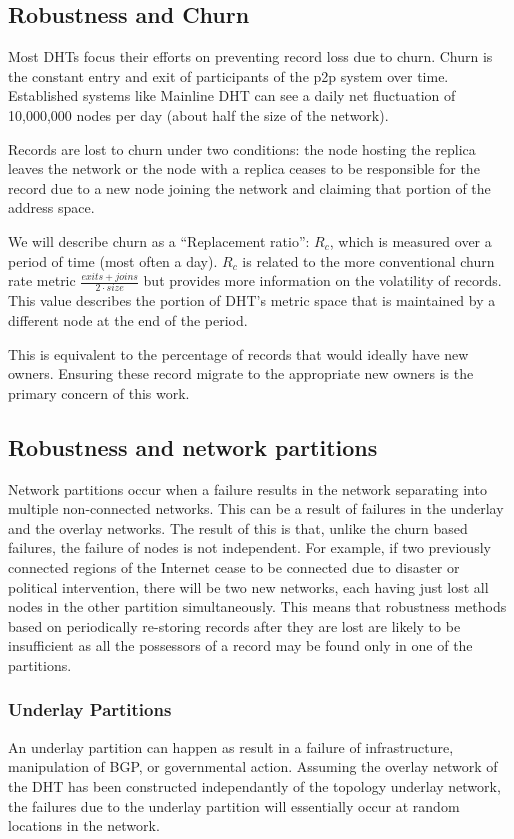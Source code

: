 	\subsection{Robustness and Churn}
	Most DHTs focus their efforts on preventing record loss due to churn.
	Churn is the constant entry and exit of participants of the p2p system over time.
	Established systems like Mainline DHT can see a daily net fluctuation of 10,000,000 nodes per day \cite{6688697} (about half the size of the network). 
	
	Records are lost to churn under two conditions: the node hosting the replica leaves the network or the node with a replica ceases to be responsible for the record due to a new node joining the network and claiming that portion of the address space. 
	
	We will describe churn as a ``Replacement ratio'': $R_{c}$, which is measured over a period of time (most often a day).
	$R_{c}$ is related to the more conventional churn rate metric $\frac{exits + joins}{2 \cdot size}$ but provides more information on the volatility of records.
	This value describes the portion of DHT's metric space that is maintained by a different node at the end of the period.
	
	This is equivalent to the percentage of records that would ideally have new owners.
	Ensuring these record migrate to the appropriate new owners is the primary concern of this work.  %
	
	
	\subsection{Robustness and network partitions}
	Network partitions occur when a failure results in the network separating into multiple non-connected networks.
	This can be a result of failures in the underlay and the overlay networks.
	The result of this is that, unlike the churn based failures,  the failure of nodes is not independent.
	For example, if two previously connected regions of the Internet cease to be connected due to disaster or political intervention, there will be two new networks, each having just lost all nodes in the other partition simultaneously.
	This means that robustness methods based on periodically re-storing records after they are lost are likely to be insufficient as all the possessors of a record may be found only in one of the partitions.
	
	\subsubsection{Underlay Partitions}
	An underlay partition can happen as result in a failure of infrastructure, manipulation of BGP, or governmental action.
	Assuming the overlay network of the DHT has been constructed independantly of the topology underlay network, the failures due to the underlay partition will essentially occur at random locations in the network. 
	
